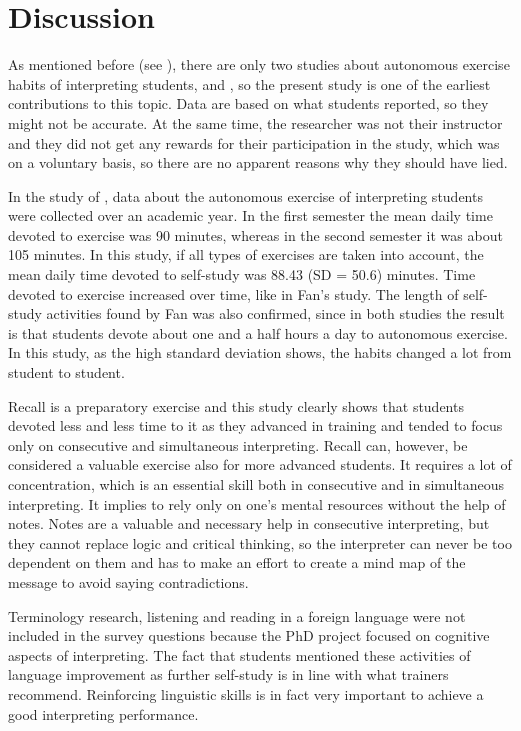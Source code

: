 \documentclass[output=paper]{../langscibook}
\begin{document}
\section{Discussion}
As mentioned before (see ), there are only two studies about autonomous exercise habits of interpreting students, \citet{Fan2012} and \citet{Wang2016}, so the present study is one of the earliest contributions to this topic. Data are based on what students reported, so they might not be accurate. At the same time, the researcher was not their instructor and they did not get any rewards for their participation in the study, which was on a voluntary basis, so there are no apparent reasons why they should have lied.

In the study of \citet{Fan2012}, data about the autonomous exercise of interpreting students were collected over an academic year. In the first semester the mean daily time devoted to exercise was 90 minutes, whereas in the second semester it was about 105 minutes. In this study, if all types of exercises are taken into account, the mean daily time devoted to self-study was 88.43 (SD = 50.6) minutes. Time devoted to exercise increased over time, like in Fan’s study. The length of self-study activities found by Fan was also confirmed, since in both studies the result is that students devote about one and a half hours a day to autonomous exercise. In this study, as the high standard deviation shows, the habits changed a lot from student to student.

Recall is a preparatory exercise and this study clearly shows that students devoted less and less time to it as they advanced in training and tended to focus only on consecutive and simultaneous interpreting. Recall can, however, be considered a valuable exercise also for more advanced students. It requires a lot of concentration, which is an essential skill both in consecutive and in simultaneous interpreting. It implies to rely only on one’s mental resources without the help of notes. Notes are a valuable and necessary help in consecutive interpreting, but they cannot replace logic and critical thinking, so the interpreter can never be too dependent on them and has to make an effort to create a mind map of the message to avoid saying contradictions.

Terminology research, listening and reading in a foreign language were not included in the survey questions because the PhD project focused on cognitive aspects of interpreting. The fact that students mentioned these activities of language improvement as further self-study is in line with what trainers recommend. Reinforcing linguistic skills is in fact very important to achieve a good interpreting performance.
\end{document}
